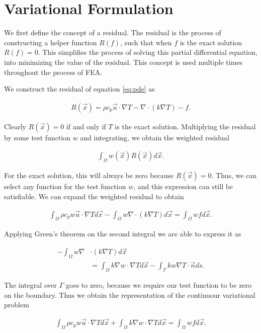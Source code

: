 \documentclass[../fem.tex]{subfiles}
\begin{document}
\section{Variational Formulation}%
\label{sec:variational_formulation}

We first define the concept of a residual. The residual is the process of
constructing a helper function $R(f)$, such that when $f$ is the exact solution
$R(f)=0$. This simplifies the process of solving this partial differential
equation, into minimizing the value of the residual. This concept is used
multiple times throughout the process of FEA.

We construct the residual of equation \ref{eq:pde} as

\begin{align*}
  R(\vec{x})=\rho c_p\vec{u}\cdot\nabla T-\nabla\cdot(k\nabla T)-f.
\end{align*}

Clearly $R(\vec{x})=0$ if and only if $T$ is the exact solution. Multiplying
the residual by some test function $w$ and integrating, we obtain the weighted
residual

\begin{align*}
  \int_\Omega w(\vec{x})R(\vec{x})d\vec{x}.
\end{align*}

For the exact solution, this will always be zero because $R(\vec{x})=0$. Thus,
we can select any function for the test function $w$, and this expression can
still be satisfiable. We can expand the weighted residual to obtain

\begin{align}\label{eq:weight_res}
  \int_\Omega\rho c_p w\vec{u}\cdot\nabla T d\vec{x} - \int_\Omega
  w\nabla\cdot(k\nabla T)d\vec{x}=\int_\Omega wf d\vec{x}.
\end{align}

Applying Green's theorem on the second integral we are able to express it as

\begin{align*}
  -\int_\Omega w\nabla&\cdot(k\nabla T)d\vec{x}\\
  &=\int_\Omega k\nabla w\cdot \nabla T d\vec{x} - \int_\Gamma kw\nabla T\cdot \vec{n}ds.
\end{align*}

The integral over $\Gamma$ goes to zero, because we require our test function
to be zero on the boundary. Thus we obtain the representation of the continuour
variational problem

\begin{align}\label{eq:cvp}
  \int_\Omega \rho c_p w \vec{u}\cdot\nabla Td\vec{x}+\int_\Omega k\nabla
  w\cdot\nabla Td\vec{x}=\int_\Omega wfd\vec{x}.
\end{align}
\end{document}
